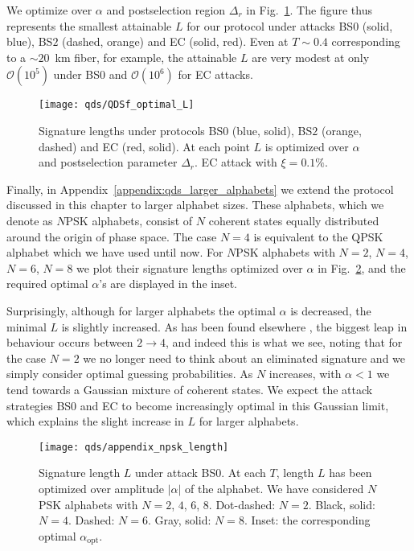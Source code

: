 We optimize over $\alpha$ and postselection region $\Delta_r$ in Fig.~\ref{fig:qds_optimal_L}. The figure thus represents the smallest attainable $L$ for our protocol under attacks BS$0$ (solid, blue), BS$2$ (dashed, orange) and EC (solid, red). Even at $T \sim 0.4$ corresponding to a $\sim 20$~km fiber, for example, the attainable $L$ are very modest at only $\mathcal{O}\left(10^5\right)$ under BS$0$ and $\mathcal{O}\left(10^6\right)$ for EC attacks. 


\begin{figure}[htp]
\centering
\texttt{[image: qds/QDSf\_optimal\_L]}
\caption{\label{fig:qds_optimal_L} Signature lengths under protocols BS$0$ (blue, solid), BS$2$ (orange, dashed) and EC (red, solid). At each point $L$ is optimized over $\alpha$ and postselection parameter $\Delta_r$. EC attack with $\xi = 0.1\%$.}
\end{figure}

Finally, in Appendix~\ref{appendix:qds_larger_alphabets} we extend the protocol discussed in this chapter to larger alphabet sizes. These alphabets, which we denote as $N$PSK alphabets, consist of $N$ coherent states equally distributed around the origin of phase space. The case $N=4$ is equivalent to the QPSK alphabet which we have used until now. For $N$PSK alphabets with $N=2$, $N=4$, $N=6$, $N=8$ we plot their signature lengths optimized over $\alpha$ in Fig.~\ref{fig:qds_npsk_length_body}, and the required optimal $\alpha$'s are displayed in the inset. 

Surprisingly, although for larger alphabets the optimal $\alpha$ is decreased, the minimal $L$ is slightly increased. As has been found elsewhere \cite{Leverrier2011}, the biggest leap in behaviour occurs between $2 \rightarrow 4$, and indeed this is what we see, noting that for the case $N=2$ we no longer need to think about an eliminated signature and we simply consider optimal guessing probabilities. As $N$ increases, with $\alpha < 1$ we tend towards a Gaussian mixture of coherent states. We expect the attack strategies BS$0$ and EC to become increasingly optimal in this Gaussian limit, which explains the slight increase in $L$ for larger alphabets.

\begin{figure}[htp]
\centering
\texttt{[image: qds/appendix\_npsk\_length]}
\caption{\label{fig:qds_npsk_length_body} Signature length $L$ under attack BS$0$. At each $T$, length $L$ has been optimized over amplitude $\left|\alpha\right|$ of the alphabet. We have considered $N$PSK alphabets with $N = 2$, $4$, $6$, $8$. Dot-dashed: $N=2$. Black, solid: $N = 4$. Dashed: $N = 6$. Gray, solid: $N = 8$. Inset: the corresponding optimal $\alpha_{\text{opt}}$. } %
\end{figure}

